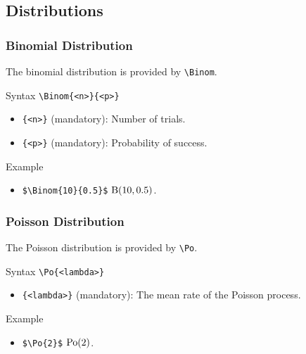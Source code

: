 \subsection{Distributions}

\subsubsection{Binomial Distribution}

The binomial distribution is provided by \verb|\Binom|.

\begin{myframe}{Syntax }
    \verb|\Binom{<n>}{<p>}|
    \begin{itemize}
        \item \verb|{<n>}| (mandatory): Number of trials.
        \item \verb|{<p>}| (mandatory): Probability of success.
    \end{itemize}
\end{myframe}

\begin{myframe}{Example }
    \begin{itemize}
        \item \verb|$\Binom{10}{0.5}$| \produces{} ${\mathrm{B}}{\left( 10, 0.5 \right)}$.
    \end{itemize}
\end{myframe}

\subsubsection{Poisson Distribution}

The Poisson distribution is provided by \verb|\Po|.

\begin{myframe}{Syntax }
    \verb|\Po{<lambda>}|
    \begin{itemize}
        \item \verb|{<lambda>}| (mandatory): The mean rate of the Poisson process.
    \end{itemize}
\end{myframe}

\begin{myframe}{Example }
    \begin{itemize}
        \item \verb|$\Po{2}$| \produces{} ${\mathrm{Po}}{\left( 2 \right)}$.
    \end{itemize}
\end{myframe}

